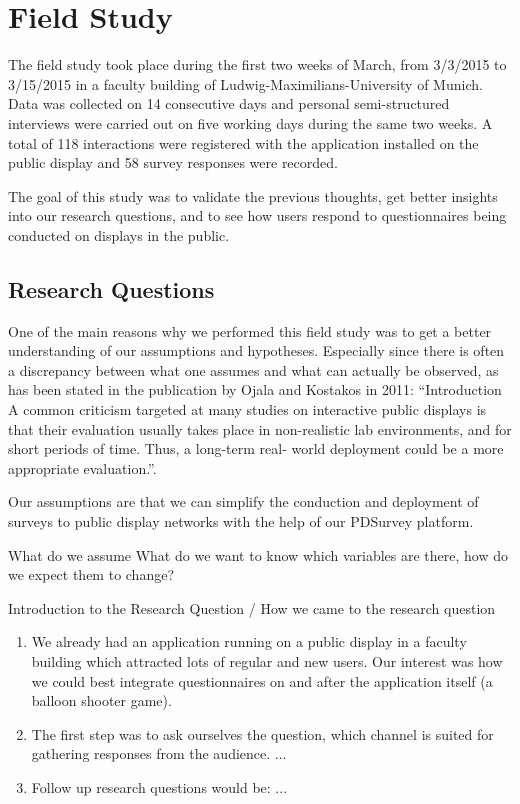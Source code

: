 \section{Field Study}

	The field study took place during the first two weeks of March, from 3/3/2015 to 3/15/2015 in a faculty building of Ludwig-Maximilians-University of Munich. Data was collected on 14 consecutive days and personal semi-structured interviews were carried out on five working days during the same two weeks. A total of 118 interactions were registered with the application installed on the public display and 58 survey responses were recorded.

	The goal of this study was to validate the previous thoughts, get better insights into our research questions, and to see how users respond to questionnaires being conducted on displays in the public.



\subsection{Research Questions}

	One of the main reasons why we performed this field study was to get a better understanding of our assumptions and hypotheses. Especially since there is often a discrepancy between what one assumes and what can actually be observed, as has been stated in the publication by Ojala and Kostakos in 2011: ``Introduction A common criticism targeted at many studies on interactive public displays is that their evaluation usually takes place in non-realistic lab environments, and for short periods of time. Thus, a long-term real- world deployment could be a more appropriate evaluation.''\cite{Ojala2011}.

	Our assumptions are that we can simplify the conduction and deployment of surveys to public display networks with the help of our PDSurvey platform.

	What do we assume
	What do we want to know
		which variables are there, how do we expect them to change?


	Introduction to the Research Question / How we came to the research question
	\begin{enumerate}
	\item We already had an application running on a public display in a faculty building which attracted lots of regular and new users. Our interest was how we could best integrate questionnaires on and after the application itself (a balloon shooter game).
	\item The first step was to ask ourselves the question, which channel is suited for gathering responses from the audience. ...
	\item Follow up research questions would be: ...
	\end{enumerate}


